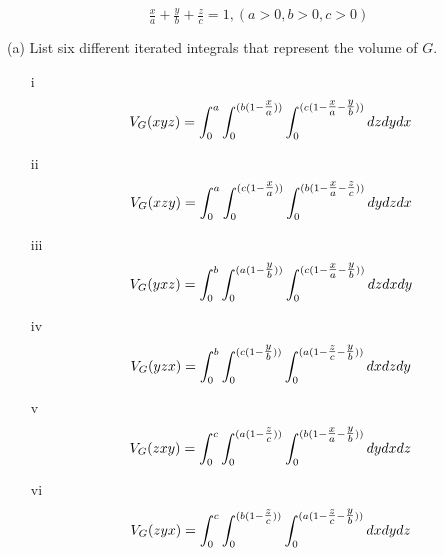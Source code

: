 \documentclass[11pt]{report}
\begin{document}
\[ \tfrac{x}{a} + \tfrac{y}{b} + \tfrac{z}{c} = 1, (a > 0, b > 0, c > 0) \]

(a) List six different iterated integrals that represent the volume of $G$. \\
\begin{itemize}
	\item[i] \[V_G(xyz)=\int_0^{a}\int_0^{(b(1-\tfrac{x}{a}))}\int_0^{(c(1-\tfrac{x}{a}-\tfrac{y}{b}))}dzdydx\]
	\item[ii] \[V_G(xzy)=\int_0^{a}\int_0^{(c(1-\tfrac{x}{a}))}\int_0^{(b(1-\tfrac{x}{a}-\tfrac{z}{c}))}dydzdx\]
	\item[iii] \[V_G(yxz)=\int_0^{b}\int_0^{(a(1-\tfrac{y}{b}))}\int_0^{(c(1-\tfrac{x}{a}-\tfrac{y}{b}))}dzdxdy\]
	\item[iv] \[V_G(yzx)=\int_0^{b}\int_0^{(c(1-\tfrac{y}{b}))}\int_0^{(a(1-\tfrac{z}{c}-\tfrac{y}{b}))}dxdzdy\]
	\item[v] \[V_G(zxy)=\int_0^{c}\int_0^{(a(1-\tfrac{z}{c}))}\int_0^{(b(1-\tfrac{x}{a}-\tfrac{y}{b}))}dydxdz\]
	\item[vi] \[V_G(zyx)=\int_0^{c}\int_0^{(b(1-\tfrac{z}{c}))}\int_0^{(a(1-\tfrac{z}{c}-\tfrac{y}{b}))}dxdydz\]
\end{itemize}
\end{document}
